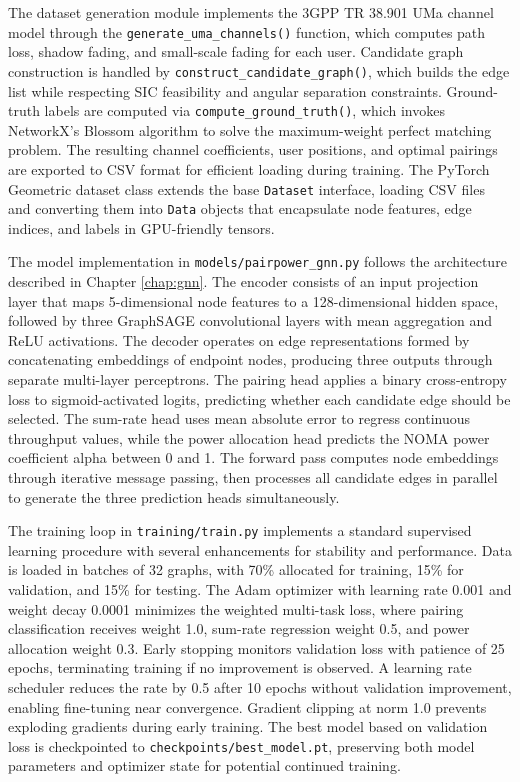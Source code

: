 The dataset generation module implements the 3GPP TR 38.901 UMa channel model through the \texttt{generate\_uma\_channels()} function, which computes path loss, shadow fading, and small-scale fading for each user. Candidate graph construction is handled by \texttt{construct\_candidate\_graph()}, which builds the edge list while respecting SIC feasibility and angular separation constraints. Ground-truth labels are computed via \texttt{compute\_ground\_truth()}, which invokes NetworkX's Blossom algorithm to solve the maximum-weight perfect matching problem. The resulting channel coefficients, user positions, and optimal pairings are exported to CSV format for efficient loading during training. The PyTorch Geometric dataset class extends the base \texttt{Dataset} interface, loading CSV files and converting them into \texttt{Data} objects that encapsulate node features, edge indices, and labels in GPU-friendly tensors.

The model implementation in \texttt{models/pairpower\_gnn.py} follows the architecture described in Chapter \ref{chap:gnn}. The encoder consists of an input projection layer that maps 5-dimensional node features to a 128-dimensional hidden space, followed by three GraphSAGE convolutional layers with mean aggregation and ReLU activations. The decoder operates on edge representations formed by concatenating embeddings of endpoint nodes, producing three outputs through separate multi-layer perceptrons. The pairing head applies a binary cross-entropy loss to sigmoid-activated logits, predicting whether each candidate edge should be selected. The sum-rate head uses mean absolute error to regress continuous throughput values, while the power allocation head predicts the NOMA power coefficient alpha between 0 and 1. The forward pass computes node embeddings through iterative message passing, then processes all candidate edges in parallel to generate the three prediction heads simultaneously.

The training loop in \texttt{training/train.py} implements a standard supervised learning procedure with several enhancements for stability and performance. Data is loaded in batches of 32 graphs, with 70\% allocated for training, 15\% for validation, and 15\% for testing. The Adam optimizer with learning rate 0.001 and weight decay 0.0001 minimizes the weighted multi-task loss, where pairing classification receives weight 1.0, sum-rate regression weight 0.5, and power allocation weight 0.3. Early stopping monitors validation loss with patience of 25 epochs, terminating training if no improvement is observed. A learning rate scheduler reduces the rate by 0.5 after 10 epochs without validation improvement, enabling fine-tuning near convergence. Gradient clipping at norm 1.0 prevents exploding gradients during early training. The best model based on validation loss is checkpointed to \texttt{checkpoints/best\_model.pt}, preserving both model parameters and optimizer state for potential continued training.

